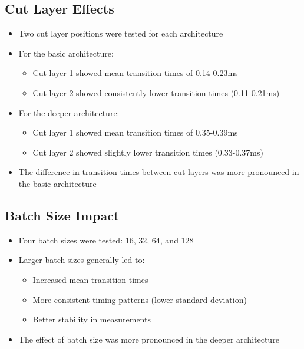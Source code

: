\documentclass[10pt]{article}
\begin{document}
\subsection{Cut Layer Effects}
\begin{itemize}
    \item Two cut layer positions were tested for each architecture
    \item For the basic architecture:
        \begin{itemize}
            \item Cut layer 1 showed mean transition times of 0.14-0.23ms
            \item Cut layer 2 showed consistently lower transition times (0.11-0.21ms)
        \end{itemize}
    \item For the deeper architecture:
        \begin{itemize}
            \item Cut layer 1 showed mean transition times of 0.35-0.39ms
            \item Cut layer 2 showed slightly lower transition times (0.33-0.37ms)
        \end{itemize}
    \item The difference in transition times between cut layers was more pronounced in the basic architecture
\end{itemize}

\subsection{Batch Size Impact}
\begin{itemize}
    \item Four batch sizes were tested: 16, 32, 64, and 128
    \item Larger batch sizes generally led to:
        \begin{itemize}
            \item Increased mean transition times
            \item More consistent timing patterns (lower standard deviation)
            \item Better stability in measurements
        \end{itemize}
    \item The effect of batch size was more pronounced in the deeper architecture
\end{itemize}
\end{document}
